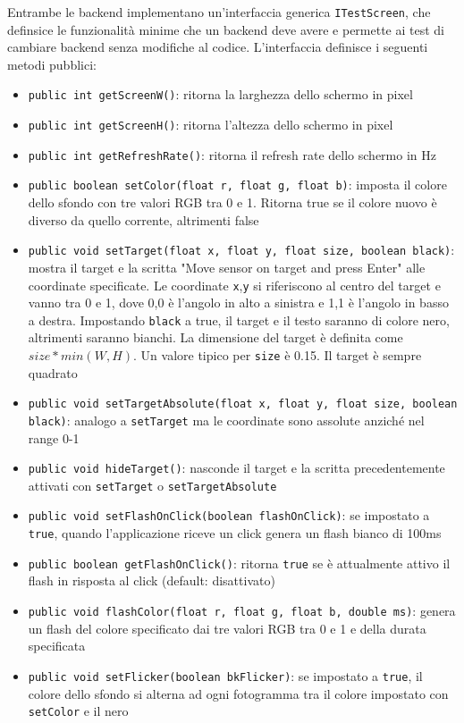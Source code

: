Entrambe le backend implementano un'interfaccia generica \texttt{ITestScreen}, che definsice le funzionalità minime che un backend deve avere e permette ai test di cambiare backend senza modifiche al codice. L'interfaccia definisce i seguenti metodi pubblici:
\begin{itemize}
	\item \texttt{public int getScreenW()}: ritorna la larghezza dello schermo in pixel
	\item \texttt{public int getScreenH()}: ritorna l'altezza dello schermo in pixel
	\item \texttt{public int getRefreshRate()}: ritorna il refresh rate dello schermo in Hz
	\item \texttt{public boolean setColor(float r, float g, float b)}: imposta il colore dello sfondo con tre valori RGB tra 0 e 1. Ritorna true se il colore nuovo è diverso da quello corrente, altrimenti false
	\item \texttt{public void setTarget(float x, float y, float size, boolean black)}: mostra il target e la scritta "Move sensor on target and press Enter" alle coordinate specificate. Le coordinate \texttt{x},\texttt{y} si riferiscono al centro del target e vanno tra 0 e 1, dove 0,0 è l'angolo in alto a sinistra e 1,1 è l'angolo in basso a destra. Impostando \texttt{black} a true, il target e il testo saranno di colore nero, altrimenti saranno bianchi. La dimensione del target è definita come $size*min(W,H)$. Un valore tipico per \texttt{size} è 0.15. Il target è sempre quadrato
	\item \texttt{public void setTargetAbsolute(float x, float y, float size, boolean black)}: analogo a \texttt{setTarget} ma le coordinate sono assolute anziché nel range 0-1
	\item \texttt{public void hideTarget()}: nasconde il target e la scritta precedentemente attivati con \texttt{setTarget} o \texttt{setTargetAbsolute}
	\item \texttt{public void setFlashOnClick(boolean flashOnClick)}: se impostato a \texttt{true}, quando l'applicazione riceve un click genera un flash bianco di 100ms
	\item \texttt{public boolean getFlashOnClick()}: ritorna \texttt{true} se è attualmente attivo il flash in risposta al click (default: disattivato)
	\item \texttt{public void flashColor(float r, float g, float b, double ms)}: genera un flash del colore specificato dai tre valori RGB tra 0 e 1 e della durata specificata
	\item \texttt{public void setFlicker(boolean bkFlicker)}: se impostato a \texttt{true}, il colore dello sfondo si alterna ad ogni fotogramma tra il colore impostato con \texttt{setColor} e il nero

\end{itemize}
